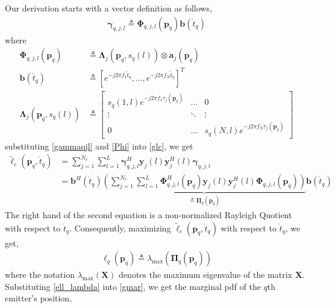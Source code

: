 \documentclass[review]{elsarticle}
\begin{document}
Our derivation starts with a vector definition as follows,
\begin{align}\label{gammaqjl}
    \boldsymbol{\gamma}_{q,j,l}\triangleq\boldsymbol{\Phi}_{q,j,l}(\boldsymbol{p}_q)\boldsymbol{b}(\mathring{t}_q)
\end{align}
where
\begin{align}\label{Phi}
    \boldsymbol{\Phi}_{q,j,l}(\boldsymbol{p}_q)&\triangleq\boldsymbol{\Lambda}_j(\boldsymbol{p}_q,s_q(l))\otimes \boldsymbol{a}_j(\boldsymbol{p}_q)\\
    \boldsymbol{b}(\mathring{t}_q)&\triangleq[e^{-j2\pi f_1\mathring{t}_q},...,e^{-j2\pi f_N\mathring{t}_q}]^T\\
    \boldsymbol{\Lambda}_j(\boldsymbol{p}_q,s_q(l))&\triangleq 
    \left[ 
    \begin{array}{ccc}
        s_q(1,l)e^{-j2\pi f_1\tau_j(\boldsymbol{p}_q)}& \ldots & 0\\
        \vdots&\ddots&\vdots\\
        0&\ldots&s_q(N,l)e^{-j2\pi f_N\tau_j(\boldsymbol{p}_q)}
    \end{array}
    \right ]   
\end{align}
substituting \eqref{gammaqjl} and \eqref{Phi} into \eqref{glc}, we get
\begin{align}
    \tilde{\ell}_c(\boldsymbol{p}_q,\mathring{t}_q)&= \sum_{j=1}^{N_r} \sum_{l=1}^{L} \boldsymbol{\gamma}_{q,j,l}^H\boldsymbol{y}_j(l)\boldsymbol{y}_j^H(l)\boldsymbol{\gamma}_{q,j,l}\\
    &=\boldsymbol{b}^H(\mathring{t}_q)\underbrace{\left(\sum_{j=1}^{N_r} \sum_{l=1}^{L} \boldsymbol{\Phi}^H_{q,j,l}(\boldsymbol{p}_q)\boldsymbol{y}_j(l)\boldsymbol{y}_j^H(l)\boldsymbol{\Phi}_{q,j,l}(\boldsymbol{p}_q)\right)}_{\triangleq\boldsymbol{\Pi}_q(\boldsymbol{p}_q)} \boldsymbol{b}(\mathring{t}_q)
\end{align}
The right hand of the second equation is a non-normalized Rayleigh Quotient with respect to $\mathring{t}_q$. Consequently, maximizing $\tilde{\ell}_c(\boldsymbol{p}_q,\mathring{t}_q)$ with respect to $\mathring{t}_q$, we get,
\begin{align}\label{ell_lambda}
    \ell_q(\boldsymbol{p}_q)\triangleq\lambda_{\text{max}}(\boldsymbol{\Pi}_q(\boldsymbol{p}_q))
\end{align}
where the notation $\lambda_{\text{max}}(\boldsymbol{X})$ denotes the maximum eigenvalue of the matrix $\boldsymbol{X}$. Substituting \eqref{ell_lambda} into \eqref{gmar}, we get the marginal pdf of the $q$th emitter's position,
\end{document}
